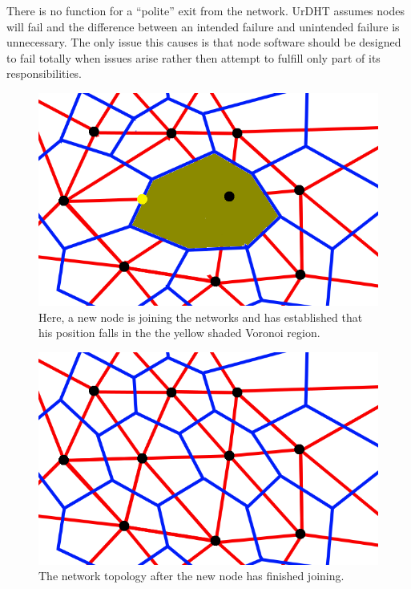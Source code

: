 There is no function for a ``polite'' exit from the network. UrDHT assumes nodes will fail and the difference between an intended failure and unintended failure is unnecessary. The only issue this causes is that node software should be designed to fail totally when issues arise rather then attempt to fulfill only part of its responsibilities.  





\begin{figure}
	\includegraphics[width=\linewidth]{figs/voronoi-churn4}
	\caption{Here, a new node is joining the networks and has established that his position falls in the the yellow shaded Voronoi region.}
	\label{fig:churnjoin}
\end{figure}


\begin{figure}
	\includegraphics[width=\linewidth]{figs/voronoi-example}
	\caption{The network topology after the new node has finished joining.}
	\label{fig:churndone}
\end{figure}


